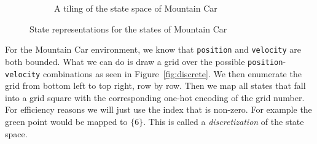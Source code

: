 \begin{figure}[H]
\begin{subfigure}{0.5\textwidth}
\caption{A tiling of the state space of Mountain Car}
\label{fig:tiling}
\end{subfigure}

\caption{State representations for the states of Mountain Car}
\label{fig:states}
\end{figure}

For the Mountain Car environment, we know that \texttt{position} and \texttt{velocity} are both bounded. What we can do is draw a grid over the possible \texttt{position}-\texttt{velocity} combinations as seen in Figure~\ref{fig:discrete}. We then enumerate the grid from bottom left to top right, row by row. Then we map all states that fall into a grid square with the corresponding one-hot encoding of the grid number. For efficiency reasons we will just use the index that is non-zero. For example the green point would be mapped to $\{6\}$. This is called a \emph{discretization} of the state space.


